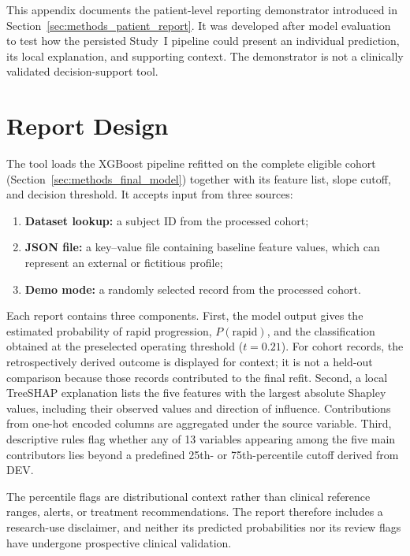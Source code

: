 This appendix documents the patient-level reporting demonstrator introduced in Section~\ref{sec:methods_patient_report}. It was developed after model evaluation to test how the persisted Study~I pipeline could present an individual prediction, its local explanation, and supporting context. The demonstrator is not a clinically validated decision-support tool.

\section{Report Design}
\label{app:patient_report_design}

The tool loads the XGBoost pipeline refitted on the complete eligible cohort (Section~\ref{sec:methods_final_model}) together with its feature list, slope cutoff, and decision threshold. It accepts input from three sources:
\begin{enumerate}
  \item \textbf{Dataset lookup:} a subject \gls{ID} from the processed cohort;
  \item \textbf{\gls{JSON} file:} a key--value file containing baseline feature values, which can represent an external or fictitious profile;
  \item \textbf{Demo mode:} a randomly selected record from the processed cohort.
\end{enumerate}

Each report contains three components. First, the model output gives the estimated probability of rapid progression, $P(\text{rapid})$, and the classification obtained at the preselected operating threshold ($t=0.21$). For cohort records, the retrospectively derived outcome is displayed for context; it is not a held-out comparison because those records contributed to the final refit. Second, a local TreeSHAP explanation lists the five features with the largest absolute Shapley values, including their observed values and direction of influence. Contributions from one-hot encoded columns are aggregated under the source variable. Third, descriptive rules flag whether any of 13 variables appearing among the five main contributors lies beyond a predefined 25th- or 75th-percentile cutoff derived from \gls{DEV}.

The percentile flags are distributional context rather than clinical reference ranges, alerts, or treatment recommendations. The report therefore includes a research-use disclaimer, and neither its predicted probabilities nor its review flags have undergone prospective clinical validation.

